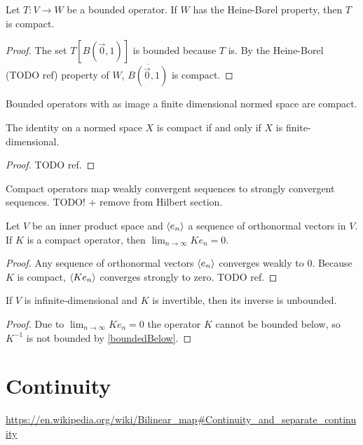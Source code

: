 \begin{lemma}
Let $T:V\to W$ be a bounded operator. If $W$ has the Heine-Borel property, then $T$ is compact.
\end{lemma}
\begin{proof}
The set $T[B(\vec{0},1)]$ is bounded because $T$ is. By the Heine-Borel (TODO ref) property of $W$, $\overline{B(\vec{0},1)}$ is compact.
\end{proof}
\begin{corollary}
Bounded operators with as image a finite dimensional normed space are compact.
\end{corollary}
\begin{corollary}
The identity on a normed space $X$ is compact \textup{if and only if} $X$ is finite-dimensional.
\end{corollary}
\begin{proof}
TODO ref. 
\end{proof}

\begin{proposition}
Compact operators map weakly convergent sequences to strongly convergent sequences. TODO! + remove from Hilbert section.
\end{proposition}
\begin{corollary} \label{limitCompactImageOrthonormalSequence}
Let $V$ be an inner product space and $\left\langle e_n \right\rangle$ a sequence of orthonormal vectors in $V$. If $K$ is a compact operator, then $\lim_{n\to\infty}Ke_n = 0$.
\end{corollary}
\begin{proof}
Any sequence of orthonormal vectors $\left\langle e_n \right\rangle$ converges weakly to $0$. Because $K$ is compact, $\left\langle Ke_n \right\rangle$ converges strongly to zero. TODO ref.
\end{proof}
\begin{corollary}
If $V$ is infinite-dimensional and $K$ is invertible, then its inverse is unbounded.
\end{corollary}
\begin{proof}
Due to $\lim_{n\to\infty}Ke_n = 0$ the operator $K$ cannot be bounded below, so $K^{-1}$ is not bounded by \ref{boundedBelow}.
\end{proof}

\section{Continuity}
\url{https://en.wikipedia.org/wiki/Bilinear_map#Continuity_and_separate_continuity}













